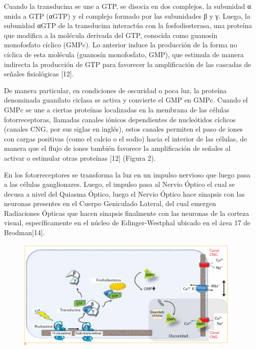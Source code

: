 \documentclass[10pt]{article}
\begin{document}
\setlength{\parskip}{2mm}

Cuando la transducina se une a GTP, se disocia en dos complejos, la subunidad α unida a GTP
(αGTP) y el complejo formado por las subunidades β y γ. Luego, la subunidad αGTP de la transducina interactúa con la fosfodiesterasa, una proteína que modifica a la molécula derivada del GTP, conocida como guanosín monofosfato cíclico (GMPc). Lo anterior induce la producción de la forma no cíclica de esta molécula (guanosín monofosfato, GMP), que estimula de manera indirecta la producción de GTP para favorecer la amplificación de las cascadas de señales fisiológicas [12].

\setlength{\parskip}{2mm}

De manera particular, en condiciones de oscuridad o poca luz, la proteína denominada guanilato ciclasa se activa y convierte el GMP en GMPc. Cuando el GMPc se une a ciertas proteínas localizadas en la membrana de las células fotorreceptoras, llamadas canales iónicos dependientes de nucleótidos cíclicos (canales CNG, por sus siglas en inglés), estos canales permiten el paso de iones con cargas positivas (como el calcio o el sodio) hacia el interior de las células, de manera que el flujo de iones también favorece la amplificación de señales al activar o estimular otras proteínas [12] (Figura 2).

\setlength{\parskip}{2mm}

En los fotorreceptores se transforma la luz en un impulso nervioso que luego pasa a las células ganglionares. Luego, el impulso pasa al Nervio Óptico el cual se decusa a nivel del Quiasma Óptico, luego el Nervio Óptico hace sinapsis con las neuronas presentes en el Cuerpo Geniculado Lateral, del cual emergen Radiaciones Ópticas que hacen sinapsis finalmente con las neuronas de la corteza visual, específicamente en el núcleo de Edinger-Westphal ubicado en el área 17 de Brodman[14].

\setlength{\parskip}{2mm}

\begin{figure}[H]
	\begin{center}
\includegraphics[scale = 0.52]{Imagenes/cascada.png}
	\end{center} 
\end{figure}
\end{document}
